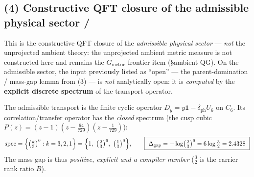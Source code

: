 \subsection*{(4) Constructive QFT closure of the admissible physical sector \mE/\mC}
This is the constructive QFT closure of the \emph{admissible physical sector} --- \emph{not} the
unprojected ambient theory: the unprojected ambient metric measure is not constructed here and remains the
$G_{\mathrm{metric}}$ frontier item (\S ambient QG). On the admissible sector, the input previously listed
as ``open'' --- the parent-domination / mass-gap lemma from (3) --- is \emph{not} analytically open: it is
\emph{computed} by the \textbf{explicit discrete spectrum} of the transport operator.

\begin{keybox}
The admissible transport is the finite cyclic operator $D_y=y\mathbf 1-\delta_{\mathrm{ph}}U_6$ on $C_6$.
Its correlation/transfer operator has the \emph{closed} spectrum (the cusp cubic
$P(z)=(z-1)(z-\tfrac{64}{729})(z-\tfrac1{729})$):
\[
  \mathrm{spec}=\Bigl\{\bigl(\tfrac{k}{3}\bigr)^6:k=3,2,1\Bigr\}=\Bigl\{1,\ \bigl(\tfrac23\bigr)^6,\ \bigl(\tfrac13\bigr)^6\Bigr\},
  \qquad
  \boxed{\ \Delta_{\mathrm{gap}}=-\log\bigl(\tfrac23\bigr)^6=6\log\tfrac32=2.4328\ }
\]
The mass gap is thus \emph{positive, explicit and a compiler number} ($\tfrac32$ is the carrier rank
ratio $B$). \mE
\end{keybox}

\begin{center}
\end{center}

